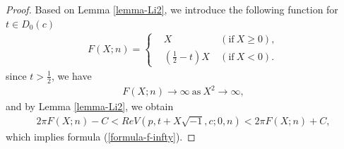 \documentclass[12pt]{amsart}
\begin{document}
\begin{proof}
Based on Lemma \ref{lemma-Li2}, we introduce the following  function for $t\in D_0(c)$
\begin{align}
    F(X;n)=\left\{ \begin{aligned}
         &X  &  \ (\text{if} \ X\geq 0), \\
         &\left(\frac{1}{2}-t\right)X & \ (\text{if} \ X<0).
                          \end{aligned} \right.
\end{align}
since $t>\frac{1}{2}$, we have 
\begin{align}
    F(X;n)\rightarrow \infty \ \text{as} \ X^2\rightarrow \infty,
\end{align}
and by Lemma \ref{lemma-Li2}, we obtain  
\begin{align}
    2\pi F(X;n)-C < ReV(p,t+X\sqrt{-1},c;0,n)< 2\pi F(X;n)+C,
\end{align}
which implies formula (\ref{formula-f-infty}). 
\end{proof}
\end{document}
